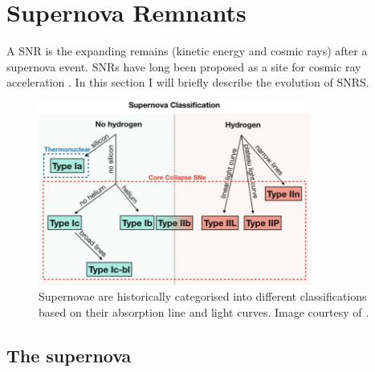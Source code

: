 \chapter{Supernova Remnants} \label{appendix:snrs}

A SNR is the expanding remains (kinetic energy and cosmic rays) after a supernova event. SNRs have long been proposed as a site for cosmic ray acceleration \citep{1934CoMtW...3...73B}. In this section I will briefly describe the evolution of SNRS.

\begin{figure}
    \centering
    \includegraphics[width=0.8\textwidth]{A1_Supernova_Remnants/Images/supernova_classification.pdf}
    \caption{Supernovae are historically categorised into different classifications based on their absorption line and light curves. Image courtesy of \cite{alma9928040781501811}.}
    \label{fig:A1_supernova_classification}
\end{figure}


\section{The supernova}

